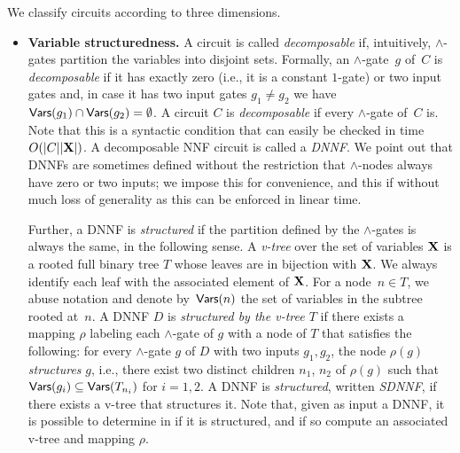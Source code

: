 We classify circuits according to three
dimensions.

\begin{itemize}
    \item \textbf{Variable structuredness.} A circuit is called \emph{decomposable} if, intuitively, $\land$-gates partition the variables into disjoint sets.
Formally, an $\land$-gate~$g$ of~$C$ is
\emph{decomposable} if it has exactly zero (i.e., it is a constant $1$-gate) or two input gates and, in case it has two input gates $g_1\neq g_2$ we
have~$\mathsf{Vars}(g_1) \cap \mathsf{Vars}(g_2) = \emptyset$. A circuit $C$ is \emph{decomposable} if every $\land$-gate of~$C$ is.
    Note that this is a syntactic condition that can easily be checked in time $O(|C||\mathbf{X}|)$. A decomposable NNF circuit is called a \emph{DNNF}. We point out that DNNFs are sometimes defined without the restriction that $\land$-nodes always have zero or two inputs; we impose this for convenience, and this if without much loss of generality as this can be enforced in linear time.
    
    Further, a DNNF is \emph{structured} if the partition defined by the $\land$-gates is always the same, in the following sense.
A \emph{v-tree} over the set of variables $\mathbf{X}$ is a rooted full binary tree $T$ whose leaves are in bijection with $\mathbf{X}$.  We
always identify each leaf with the associated element of $\mathbf{X}$. For a node~$n\in T$, we abuse notation and denote by~$\mathsf{Vars}(n)$ the set of variables in the subtree rooted at~$n$. A DNNF $D$ is \emph{structured by the v-tree $T$} if there exists a mapping $\rho$ labeling each $\land$-gate of $g$ with a node of $T$ that satisfies the following: for
every $\land$-gate $g$ of $D$ with two inputs $g_1, g_2$, the node $\rho(g)$ \emph{structures} $g$, i.e.,
there exist two distinct children $n_1$, $n_2$ of $\rho(g)$ such that $\mathsf{Vars}(g_i) \subseteq \mathsf{Vars}(T_{n_i} )$ for $i=1,2$. A DNNF is \emph{structured}, written \emph{SDNNF}, if there exists a v-tree that structures it. Note that, given as input a DNNF, it is possible to determine in  if it is structured, and if so compute an associated v-tree and mapping $\rho$.



\end{itemize}
